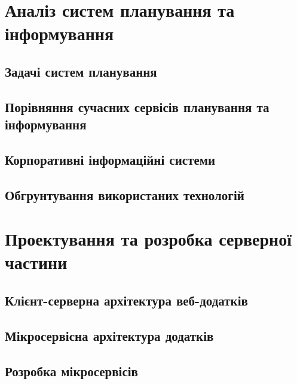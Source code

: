 \documentclass[a4paper,14pt]{extarticle} %
\begin{document}

\tableofcontents %
\clearpage


\section{Аналіз систем планування та інформування}
\subsection{Задачі систем планування} 

\subsection{Порівняння сучасних сервісів планування та інформування} 


\subsection{Корпоративні інформаційні системи} 



\subsection{Обгрунтування використаних технологій} 



\clearpage
\section{Проектування та розробка серверної частини}

\subsection{Клієнт-серверна архітектура веб-додатків} 


\subsection{Мікросервісна архітектура додатків} 


\subsection{Розробка мікросервісів} 


\end{document}
